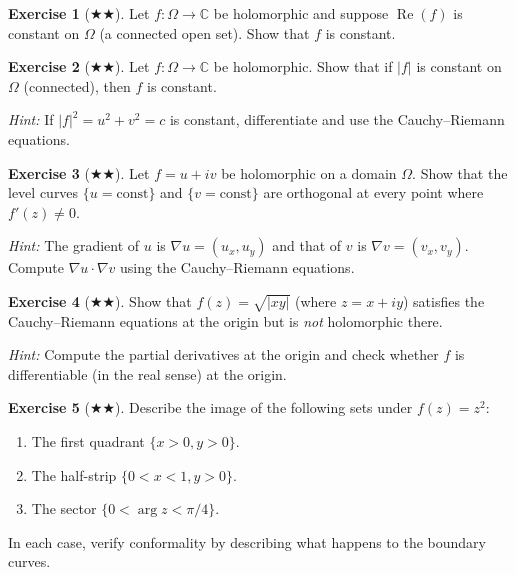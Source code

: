 \documentclass[12pt,a4paper,openany]{book}
\theoremstyle{definition}
\newtheorem{exercise}{Exercise}[chapter]
\theoremstyle{plain}
\theoremstyle{remark}
\newcommand{\C}{\mathbb{C}}
\DeclareMathOperator{\re}{Re}
\newcommand{\abs}[1]{\left|#1\right|}
\begin{document}
\begin{exercise}[$\bigstar\!\bigstar$]
\label{exo:ch2-5}
Let $f:\Omega\to\C$ be holomorphic and suppose $\re(f)$ is constant on $\Omega$ (a connected open set). Show that $f$ is constant.
\end{exercise}

\begin{exercise}[$\bigstar\!\bigstar$]
\label{exo:ch2-6}
Let $f:\Omega\to\C$ be holomorphic. Show that if $\abs{f}$ is constant on $\Omega$ (connected), then $f$ is constant.

\textit{Hint:} If $\abs{f}^2 = u^2+v^2 = c$ is constant, differentiate and use the Cauchy--Riemann equations.
\end{exercise}

\begin{exercise}[$\bigstar\!\bigstar$]
\label{exo:ch2-7}
Let $f = u+iv$ be holomorphic on a domain $\Omega$. Show that the level curves $\{u=\text{const}\}$ and $\{v=\text{const}\}$ are orthogonal at every point where $f'(z)\neq 0$.

\textit{Hint:} The gradient of $u$ is $\nabla u = (u_x,u_y)$ and that of $v$ is $\nabla v = (v_x,v_y)$. Compute $\nabla u\cdot\nabla v$ using the Cauchy--Riemann equations.
\end{exercise}

\begin{exercise}[$\bigstar\!\bigstar$]
\label{exo:ch2-8}
Show that $f(z) = \sqrt{\abs{xy}}$ (where $z=x+iy$) satisfies the Cauchy--Riemann equations at the origin but is \emph{not} holomorphic there.

\textit{Hint:} Compute the partial derivatives at the origin and check whether $f$ is differentiable (in the real sense) at the origin.
\end{exercise}

\begin{exercise}[$\bigstar\!\bigstar$]
\label{exo:ch2-9}
Describe the image of the following sets under $f(z)=z^2$:
\begin{enumerate}[label=\textup{(\alph*)}]
  \item The first quadrant $\{x>0, y>0\}$.
  \item The half-strip $\{0<x<1, y>0\}$.
  \item The sector $\{0<\arg z<\pi/4\}$.
\end{enumerate}
In each case, verify conformality by describing what happens to the boundary curves.
\end{exercise}
\end{document}
